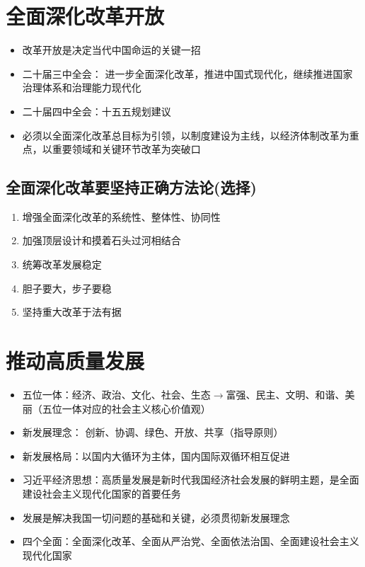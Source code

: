 \documentclass{ctexart}
\numberwithin{figure}{section}
\numberwithin{equation}{section}
\begin{document}
\section{全面深化改革开放}
    \begin{itemize}
        \item 改革开放是决定当代中国命运的关键一招
        \item 二十届三中全会： 进一步全面深化改革，推进中国式现代化，继续推进国家治理体系和治理能力现代化
        \item 二十届四中全会：十五五规划建议
        \item 必须以全面深化改革总目标为引领，以制度建设为主线，以经济体制改革为重点，以重要领域和关键环节改革为突破口
    \end{itemize}
    \subsection{全面深化改革要坚持正确方法论(选择)}
    \begin{tcolorbox}[colback=blue!5!white]
        \begin{enumerate}
            \item 增强全面深化改革的系统性、整体性、协同性
            \item 加强顶层设计和摸着石头过河相结合
            \item 统筹改革发展稳定
            \item 胆子要大，步子要稳
            \item 坚持重大改革于法有据
        \end{enumerate}
    \end{tcolorbox}

\section{推动高质量发展}
    \begin{itemize}
        \item 五位一体：经济、政治、文化、社会、生态$\longrightarrow$富强、民主、文明、和谐、美丽（五位一体对应的社会主义核心价值观）
        \item 新发展理念： 创新、协调、绿色、开放、共享（指导原则）
        \item 新发展格局：以国内大循环为主体，国内国际双循环相互促进
        \item 习近平经济思想：高质量发展是新时代我国经济社会发展的鲜明主题，是全面建设社会主义现代化国家的首要任务
        \item 发展是解决我国一切问题的基础和关键，必须贯彻新发展理念
        \item 四个全面：全面深化改革、全面从严治党、全面依法治国、全面建设社会主义现代化国家
    \end{itemize}
\end{document}
